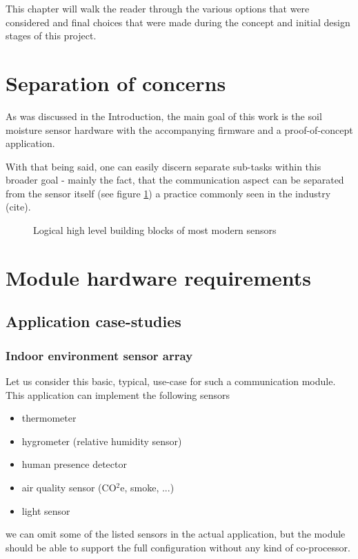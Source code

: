 
This chapter will walk the reader through the various options that were considered and final choices that were made during the concept and initial design stages of this project.

\section{Separation of concerns}

As was discussed in the Introduction, the main goal of this work is the soil moisture sensor hardware with the accompanying firmware and a proof-of-concept application. 

With that being said, one can easily discern separate sub-tasks within this broader goal - mainly the fact, that the communication aspect can be separated from the sensor itself (see figure \ref{fig:device-split}) a practice commonly seen in the industry (cite).

\begin{figure}
    
    \caption{\label{fig:device-split} Logical high level building blocks of most modern sensors}
\end{figure}



\section{Module hardware requirements}
\subsection{Application case-studies}
\subsubsection{Indoor environment sensor array}
Let us consider this basic, typical, use-case for such a communication module. This application can implement the following sensors
\begin{itemize}
    \item thermometer
    \item hygrometer (relative humidity sensor)
    \item human presence detector
    \item air quality sensor (CO$^2$e, smoke, ...)
    \item light sensor
\end{itemize}
we can omit some of the listed sensors in the actual application, but the module should be able to support the full configuration without any kind of co-processor.

